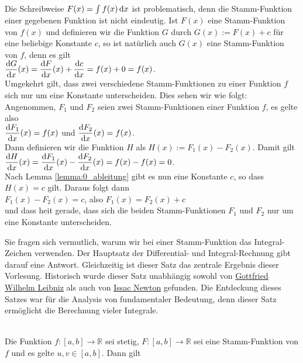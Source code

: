 Die Schreibweise $F(x) = \int f(x) \, \textrm{d} x$ ist problematisch, denn die Stamm-Funktion einer
gegebenen Funktion ist nicht eindeutig.  Ist $F(x)$ eine Stamm-Funktion von $f(x)$ und
definieren wir die Funktion $G$ durch $G(x) := F(x) + c$ f\"ur eine beliebige Konstante $c$,
so ist nat\"urlich auch $G(x)$ eine Stamm-Funktion von $f$, denn es gilt
\\[0.2cm]
\hspace*{1.3cm}
$\displaystyle\frac{\textrm{d}G}{\textrm{d}x}(x) = \displaystyle\frac{\textrm{d}F}{\textrm{d}x}(x) + \displaystyle\frac{\textrm{d}c}{\textrm{d}x} = f(x) + 0 = f(x)$.
\\[0.2cm]
Umgekehrt gilt, dass zwei verschiedene Stamm-Funktionen zu einer Funktion $f$ sich nur um
eine Konstante unterscheiden.  Dies sehen wir wie folgt: Angenommen, $F_1$ und $F_2$ seien
zwei Stamm-Funktionen einer Funktion $f$, es gelte also 
\\[0.2cm]
\hspace*{1.3cm}
$\displaystyle\frac{\textrm{d}F_1}{\textrm{d}x}(x) = f(x)$ \quad und \quad $\displaystyle\frac{\textrm{d}F_2}{\textrm{d}x}(x) = f(x)$.
\\[0.2cm]
Dann definieren wir die Funktion $H$ als $H(x) := F_1(x) - F_2(x)$.  Damit gilt
\\[0.2cm]
\hspace*{1.3cm}
$\displaystyle\frac{\textrm{d}H}{\textrm{d}x}(x) = \displaystyle\frac{\textrm{d}F_1}{\textrm{d}x}(x) - \displaystyle\frac{\textrm{d}F_2}{\textrm{d}x}(x) = f(x) - f(x) = 0$.
\\[0.2cm]
Nach Lemma \ref{lemma:0_ableitung} gibt es nun eine Konstante $c$, so dass $H(x) = c$ gilt.
Daraus folgt dann
\\[0.2cm]
\hspace*{1.3cm}
$F_1(x) - F_2(x) = c$, \quad also \quad $F_1(x) = F_2(x) + c$
\\[0.2cm]
und dass hei\3t gerade, dass sich die beiden Stamm-Funktionen $F_1$ und $F_2$ nur um eine Konstante
unterscheiden.   

Sie fragen sich vermutlich, warum wir bei einer Stamm-Funktion das Integral-Zeichen verwenden.
Der Hauptsatz der Differential- und Integral-Rechnung gibt darauf eine Antwort.  Gleichzeitig ist
dieser Satz das zentrale Ergebnis dieser Vorlesung.  Historisch wurde dieser Satz unabh\"angig sowohl
von \href{https://en.wikipedia.org/wiki/Gottfried_Wilhelm_Leibniz}{Gottfried Wilhelm Leibniz} als
auch von \href{https://en.wikipedia.org/wiki/Isaac_Newton}{Issac Newton} gefunden.  Die Entdeckung
dieses Satzes war f\"ur die Analysis von  fundamentaler Bedeutung, denn dieser Satz erm\"oglicht die
Berechnung vieler Integrale.

\begin{Satz} \hspace*{\fill} \\
 Die Funktion $f:[a,b] \rightarrow\mathbb{R}$ sei stetig, $F:[a,b] \rightarrow\mathbb{R}$
sei eine Stamm-Funktion von $f$ und es gelte $u,v\in[a,b]$.  Dann gilt
\\[0.2cm]
\hspace*{1.3cm}
\colorbox{orange}{}  
\end{Satz}


